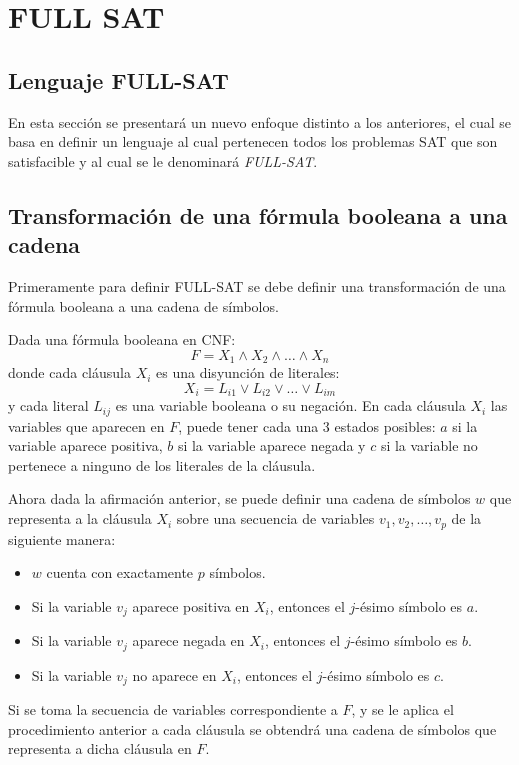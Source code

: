 \chapter{FULL SAT}

\section{Lenguaje FULL-SAT}

En esta sección se presentará un nuevo enfoque distinto a los anteriores, el cual se basa en definir un lenguaje al cual
pertenecen todos los problemas SAT que son satisfacible y al cual se le denominará \textit{FULL-SAT}.

\section{Transformación de una fórmula booleana a una cadena}

Primeramente para definir FULL-SAT se debe definir una transformación de una fórmula booleana a una cadena de símbolos.

Dada una fórmula booleana en CNF:
$$F=X_1 \wedge X_2 \wedge \ldots \wedge X_n$$
donde cada cláusula $X_i$ es una disyunción de literales:
$$X_i=L_{i1} \vee L_{i2} \vee \ldots \vee L_{im}$$
y cada literal $L_{ij}$ es una variable booleana o su negación. En cada cláusula $X_i$ las variables que aparecen en $F$,
puede tener cada una 3 estados posibles: $a$ si la variable aparece positiva, $b$ si la variable aparece negada y $c$ si la variable
no pertenece a ninguno de los literales de la cláusula.

Ahora dada la afirmación anterior, se puede definir una cadena de símbolos $w$
que representa a la cláusula $X_i$ sobre una secuencia de variables $v_1,v_2,\ldots,v_p$ de la siguiente manera:

\begin{itemize}
    \item $w$ cuenta con exactamente $p$ símbolos.
    \item Si la variable $v_j$ aparece positiva en $X_i$, entonces el $j$-ésimo símbolo es $a$.
    \item Si la variable $v_j$ aparece negada en $X_i$, entonces el $j$-ésimo símbolo es $b$.
    \item Si la variable $v_j$ no aparece en $X_i$, entonces el $j$-ésimo símbolo es $c$.
\end{itemize}
Si se toma la secuencia de variables correspondiente a $F$, y se le aplica el procedimiento anterior a cada cláusula
se obtendrá una cadena de símbolos que representa a dicha cláusula en $F$.

